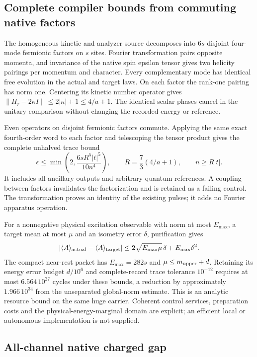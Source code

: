 \subsection{Complete compiler bounds from commuting native factors}

The homogeneous kinetic and analyzer source decomposes into $6s$ disjoint
four-mode fermionic factors on $s$ sites. Fourier transformation pairs
opposite momenta, and invariance of the native spin epsilon tensor gives
two helicity pairings per momentum and character. Every complementary
mode has identical free evolution in the actual and target laws. On each
factor the rank-one pairing has norm one. Centering its kinetic number
operator gives $\|H_r-2\kappa I\|\le 2|\kappa|+1\le4/a+1$.
The identical scalar phases cancel in the unitary comparison without
changing the recorded energy or reference.

Even operators on disjoint fermionic factors commute. Applying the same
exact fourth-order word to each factor and telescoping the tensor product
gives the complete unhalved trace bound
\[
 \epsilon\le\min\left(2,\frac{6sR^5|t|^5}{10n^4}\right),
 \qquad R=\frac73(4/a+1),\qquad n\ge R|t|.
\]
It includes all ancillary outputs and arbitrary quantum references.
A coupling between factors invalidates the factorization and is retained
as a failing control. The transformation proves an identity of the
existing pulses; it adds no Fourier apparatus operation.

For a nonnegative physical excitation observable with norm at most
$E_{\max}$, a target mean at most $\mu$ and an isometry error $\delta$,
purification gives
\[
 |\langle A\rangle_{\rm actual}-\langle A\rangle_{\rm target}|
 \le2\sqrt{E_{\max}\mu}\,\delta+E_{\max}\delta^2.
\]
The compact near-rest packet has $E_{\max}=282s$ and
$\mu\le m_{\rm upper}+d$. Retaining its energy error budget $d/10^6$
and complete-record trace tolerance $10^{-12}$ requires at most
$6.564\,10^{27}$ cycles under these bounds, a reduction by approximately
$1.966\,10^{34}$ from the unseparated global-norm estimate.
This is an analytic resource bound on the same huge carrier. Coherent
control services, preparation costs and the physical-energy-marginal
domain are explicit; an efficient local or autonomous implementation is
not supplied.


\subsection{All-channel native charged gap}


